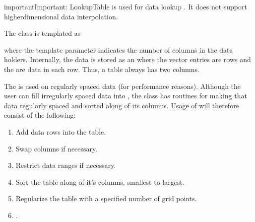\documentclass[letterpaper,10pt,english]{sphinxmanual}
\begin{document}
\begin{sphinxadmonition}{important}{Important:}
LookupTable is used for data lookup .
It does not support higher\sphinxhyphen{}dimensional data interpolation.
\end{sphinxadmonition}

The class is templated as

\begin{sphinxVerbatim}[commandchars=\\\{\},formatcom=\scriptsize]
  
 
\end{sphinxVerbatim}

where the template parameter  indicates the number of columns in the data holders.
Internally, the data is stored as an  where the vector entries are rows and the  are data in each row.
Thus, a table  always has two columns.

The  is used on regularly spaced data (for performance reasons).
Although the user can fill irregularly spaced data into , the class has routines for making that data regularly spaced and sorted along of its columns.
Usage of  will therefore consist of the following:
\begin{enumerate}
%
\item {} 
Add data rows into the table.

\item {} 
Swap columns if necessary.

\item {} 
Restrict data ranges if necessary.

\item {} 
Sort the table along of it’s columns, smallest to largest.

\item {} 
Regularize the table with a specified number of grid points.

\item {} 
.

\end{enumerate}
\end{document}
